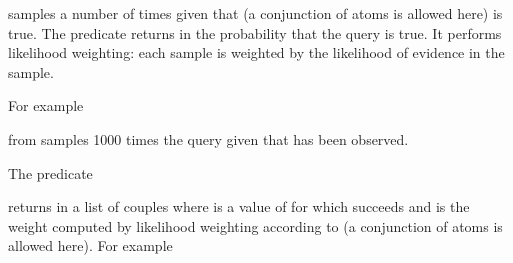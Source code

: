 \documentclass[letterpaper,10pt,english]{sphinxmanual}
\begin{document}
\sphinxAtStartPar
samples  a number of  times given that  (a conjunction of atoms is allowed here) is true.
The predicate returns in  the probability that the query is true.
It performs likelihood weighting: each sample is weighted by the likelihood of evidence in the sample.

\sphinxAtStartPar
For example

\begin{sphinxVerbatim}[commandchars=\\\{\}]
 
\end{sphinxVerbatim}

\sphinxAtStartPar
from  samples 1000 times the query  given that  has been observed.

\sphinxAtStartPar
The predicate

\begin{sphinxVerbatim}[commandchars=\\\{\}]
  
\end{sphinxVerbatim}

\sphinxAtStartPar
returns in  a list of couples  where  is a value of  for which  succeeds and  is the weight computed by likelihood weighting according to  (a conjunction of atoms is allowed here).
For example

\begin{sphinxVerbatim}[commandchars=\\\{\}]
 
\end{sphinxVerbatim}
\end{document}
